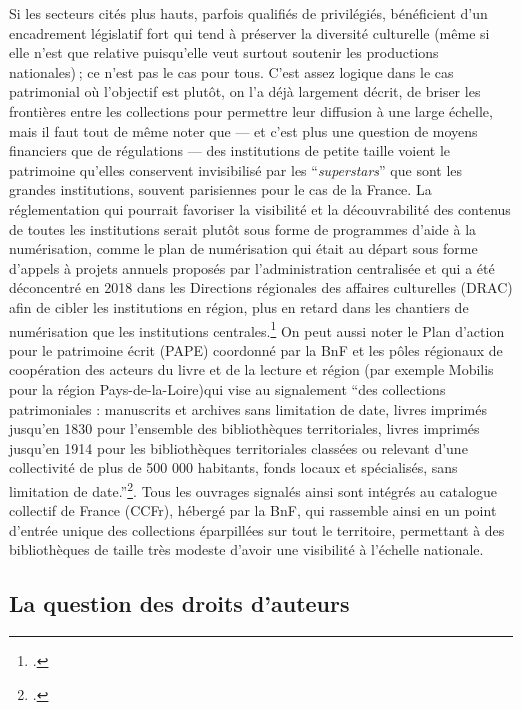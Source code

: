 Si les secteurs cités plus hauts, parfois qualifiés de privilégiés, bénéficient d’un encadrement législatif fort qui tend à préserver la diversité culturelle (même si elle n’est que relative puisqu’elle veut surtout soutenir les productions nationales) ; ce n’est pas le cas pour tous. C’est assez logique dans le cas patrimonial où l’objectif est plutôt, on l’a déjà largement décrit, de briser les frontières entre les collections pour permettre leur diffusion à une large échelle, mais il faut tout de même noter que — et c’est plus une question de moyens financiers que de régulations — des institutions de petite taille voient le patrimoine qu’elles conservent invisibilisé par les \enquote{\textit{superstars}} que sont les grandes institutions, souvent parisiennes pour le cas de la France. La réglementation qui pourrait favoriser la visibilité et la découvrabilité des contenus de toutes les institutions serait plutôt sous forme de programmes d'aide à la numérisation, comme le plan de numérisation qui était au départ sous forme d'appels à projets annuels proposés par l'administration centralisée et qui a été déconcentré en 2018 dans les Directions régionales des affaires culturelles (DRAC) afin de cibler les institutions en région, plus en retard dans les chantiers de numérisation que les institutions centrales.\footcite{zotero-686} On peut aussi noter le Plan d'action pour le patrimoine écrit (PAPE) coordonné par la BnF et les pôles régionaux de coopération des acteurs du livre et de la lecture et région (par exemple Mobilis pour la région Pays-de-la-Loire)qui vise au signalement \enquote{des collections patrimoniales : manuscrits et archives sans limitation de date, livres imprimés jusqu’en 1830 pour l’ensemble des bibliothèques territoriales, livres imprimés jusqu’en 1914 pour les bibliothèques territoriales classées ou relevant d’une collectivité de plus de 500 000 habitants, fonds locaux et spécialisés, sans limitation de date.}\footcite{zotero-688}. Tous les ouvrages signalés ainsi sont intégrés au catalogue collectif de France (CCFr), hébergé par la BnF, qui rassemble ainsi en un point d'entrée unique des collections éparpillées sur tout le territoire, permettant à des bibliothèques de taille très modeste d'avoir une visibilité à l'échelle nationale. 

\subsection{La question des droits d'auteurs}

